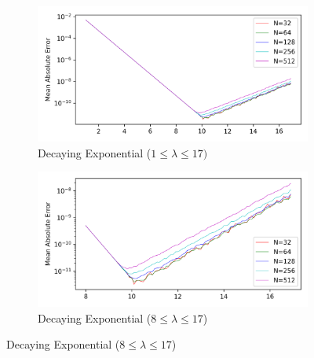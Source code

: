 \documentclass[a4paper]{report}
\begin{document}
\begin{figure}[H]
    \begin{subfigure}{.5\linewidth}
      \includegraphics[width=\linewidth]{images/abate_whitt/decaying_exp.png}
      \caption{Decaying Exponential ($1 \leq \lambda \leq 17)$}
    \end{subfigure}\hfill
    \begin{subfigure}{.5\linewidth}
      \includegraphics[width=\linewidth]{images/abate_whitt/decaying_exp_zoomed.png}
      \caption{Decaying Exponential ($8 \leq \lambda \leq 17$)}
    \end{subfigure}
    
    \medskip
    

\end{figure}
\end{document}
